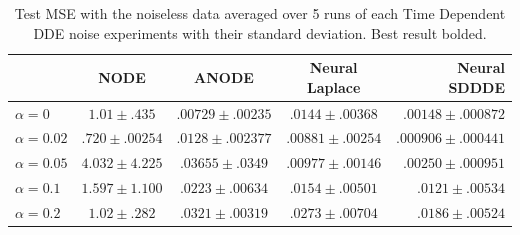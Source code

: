 \begin{table}[t]
\begin{center}
\begin{small}
\begin{sc}
\begin{tabular}{l|cccr}
  & NODE &  ANODE & Neural Laplace & Neural SDDDE \\
\hline
 $\alpha=0$ &  $1.01 \pm .435$ & $.00729 \pm .00235$ & $.0144 \pm .00368$ & $\mathbf{.00148 \pm  .000872}$ \\
 $\alpha=0.02$ & $.720 \pm .00254$ & $.0128 \pm .002377$ & $.00881 \pm .00254$ & $\mathbf{.000906 \pm .000441}$\\
 $\alpha=0.05$ &  $4.032 \pm  4.225$ & $.03655 \pm .0349$ & $.00977 \pm .00146$ & $\mathbf{.00250 \pm .000951}$\\
 $\alpha=0.1$ & $1.597 \pm 1.100$ & $.0223 \pm .00634$ & $.0154 \pm .00501$ & $\mathbf{.0121 \pm .00534}$\\
 $\alpha=0.2$ & $1.02 \pm .282$ & $.0321 \pm .00319$ & $.0273 \pm .00704$ & $\mathbf{.0186 \pm .00524}$\\
\hline
\end{tabular}
\end{sc}
\end{small}
\caption{Test MSE with the noiseless data averaged over 5 runs of each Time Dependent DDE noise experiments with their standard deviation. Best result bolded.}
\label{noiseless_mse}
\end{center}
\end{table}